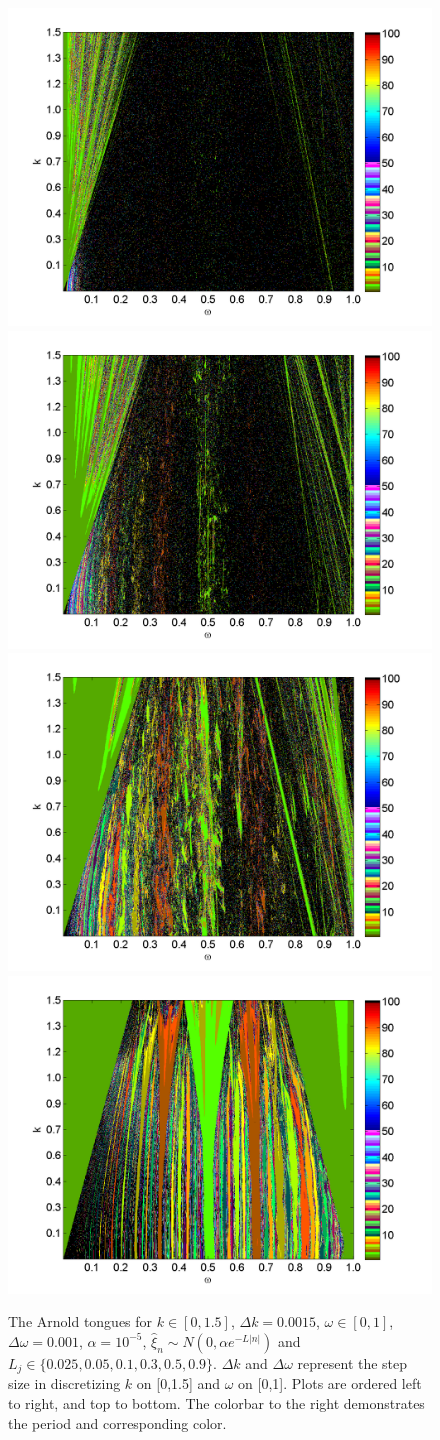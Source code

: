 \begin{figure}[H]\linespread{1}  
\caption[The Arnold tongues for the random circle map, normal
distribution, $\alpha = 10^{-5}$]{The Arnold
  tongues for $k\in [0,1.5]$, $\Delta k = 0.0015$, $\omega \in [0,1]$,
  $\Delta \omega = 0.001$, $\alpha = 10^{-5}$, $\hat{\xi}_n\sim
  N(0,\alpha e^{-L|n|})$ and $L_j \in
  \{0.025,0.05,0.1,0.3,0.5,0.9\}$. $\Delta k$ and $\Delta \omega$
  represent the step size in discretizing $k$ on [0,1.5] and $\omega$
  on [0,1]. Plots are ordered left to right, and top to bottom. The colorbar
to the right demonstrates the period and corresponding color.}\label{fig:rcirctongues_n}
\centering
\includegraphics[width=.5\textwidth]{figs/tongues_norm_1000_L_0025.png}\hfill
\includegraphics[width=.5\textwidth]{figs/tongues_norm_1000_L_005.png}\\
\includegraphics[width=.5\textwidth]{figs/tongues_norm_1000_L_01.png}\hfill
\includegraphics[width=.5\textwidth]{figs/tongues_norm_1000_L_03.png}\\

\end{figure}
